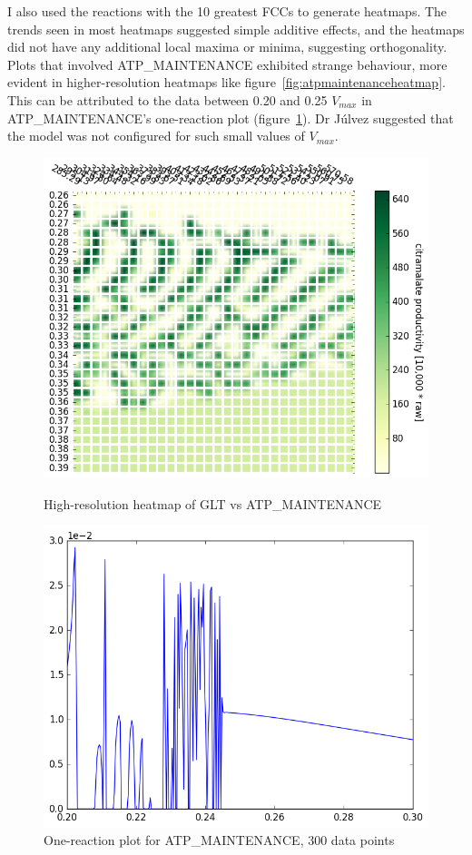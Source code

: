 \documentclass[parskip=full, numbers=noenddot]{scrreprt}
\begin{document}
I also used the reactions with the 10 greatest FCCs to generate heatmaps. The trends seen in most heatmaps suggested simple additive effects, and the heatmaps did not have any additional local maxima or minima, suggesting orthogonality. Plots that involved ATP\_MAINTENANCE exhibited strange behaviour, more evident in higher-resolution heatmaps like figure~\ref{fig:atpmaintenanceheatmap}. This can be attributed to the data between 0.20 and 0.25 $V_{max}$ in ATP\_MAINTENANCE's one-reaction plot (figure~\ref{fig:atpmaintenanceonereac}). Dr J\'ulvez suggested that the model was not configured for such small values of $V_{max}$.

\begin{figure}[hp]
  \centering
  \includegraphics[scale=0.5]{atpmaintenanceheatmap}
  \caption{High-resolution heatmap of GLT vs ATP\_MAINTENANCE}
  \label{fig:atpmaintenanceheatmap}

  \includegraphics[scale=0.5]{atpmaintenanceonereac}
  \caption{One-reaction plot for ATP\_MAINTENANCE, 300 data points}
  \label{fig:atpmaintenanceonereac}
\end{figure}
\end{document}

